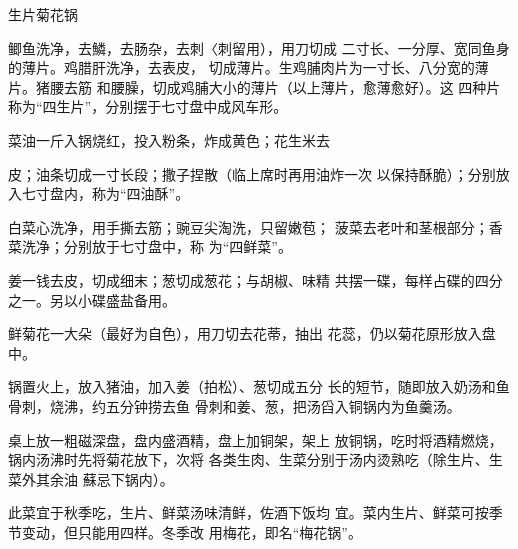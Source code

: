 \begin{recipe}{生片菊花锅}

\ingredients



\cooking

\step 	鲫鱼洗净，去鱗，去肠杂，去刺〈刺留用），用刀切成 二寸长、一分厚、宽同鱼身的薄片。鸡腊肝洗净，去表皮， 切成薄片。生鸡脯肉片为一寸长、八分宽的薄片。猪腰去筋 和腰臊，切成鸡脯大小的薄片（以上薄片，愈薄愈好）。这 四种片称为“四生片”，分别摆于七寸盘中成风车形。

\step 	菜油一斤入锅烧红，投入粉条，炸成黄色；花生米去

皮；油条切成一寸长段；撒子捏散（临上席时再用油炸一次 以保持酥脆）；分别放入七寸盘内，称为“四油酥”。

白菜心洗净，用手撕去筋；豌豆尖淘洗，只留嫩苞； 菠菜去老叶和茎根部分；香菜洗净；分别放于七寸盘中，称 为“四鲜菜”。

\step 	姜一钱去皮，切成细末；葱切成葱花；与胡椒、味精 共摆一碟，每样占碟的四分之一。另以小碟盛盐备用。

\step 	鲜菊花一大朵（最好为自色），用刀切去花蒂，抽出 花蕊，仍以菊花原形放入盘中。

\step 	锅置火上，放入猪油，加入姜（拍松）、葱切成五分 长的短节，随即放入奶汤和鱼骨刺，烧沸，约五分钟捞去鱼 骨刺和姜、葱，把汤舀入铜锅内为鱼羹汤。

\step 	桌上放一粗磁深盘，盘内盛酒精，盘上加铜架，架上 放铜锅，吃时将酒精燃烧，锅内汤沸时先将菊花放下，次将 各类生肉、生菜分别于汤内烫熟吃（除生片、生菜外其余油 蘇忌下锅内）。

\notes

此菜宜于秋季吃，生片、鲜菜汤味清鲜，佐酒下饭均 宜。菜内生片、鲜菜可按季节变动，但只能用四样。冬季改 用梅花，即名“梅花锅”。

\end{recipe}

